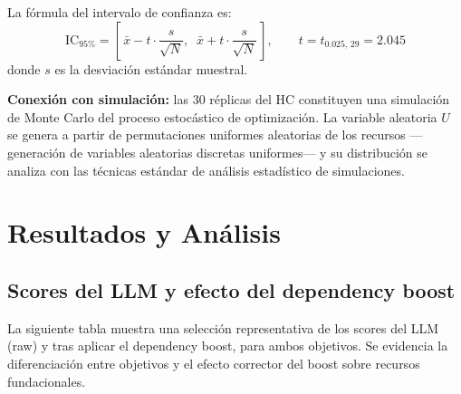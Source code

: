 \documentclass[11pt, a4paper]{article}
\begin{document}
La fórmula del intervalo de confianza es:
\[
\text{IC}_{95\%} = \left[\, \bar{x} - t \cdot \frac{s}{\sqrt{N}}, \;\; \bar{x} + t \cdot \frac{s}{\sqrt{N}} \,\right],
\qquad t = t_{0.025,\,29} = 2.045
\]
donde $s$ es la desviación estándar muestral.

\begin{notebox}
\textbf{Conexión con simulación:} las 30 réplicas del HC constituyen una simulación de Monte Carlo del proceso estocástico de optimización. La variable aleatoria $U$ se genera a partir de permutaciones uniformes aleatorias de los recursos —generación de variables aleatorias discretas uniformes— y su distribución se analiza con las técnicas estándar de análisis estadístico de simulaciones.
\end{notebox}

\section{Resultados y Análisis}
\label{sec:resultados}

\subsection{Scores del LLM y efecto del dependency boost}

La siguiente tabla muestra una selección representativa de los scores del LLM (raw) y tras aplicar el dependency boost, para ambos objetivos. Se evidencia la diferenciación entre objetivos y el efecto corrector del boost sobre recursos fundacionales.
\end{document}
